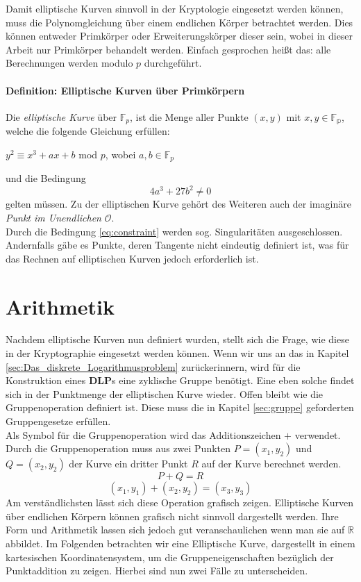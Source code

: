 Damit elliptische Kurven sinnvoll in der Kryptologie eingesetzt werden können, muss die Polynomgleichung über einem endlichen Körper betrachtet werden. Dies können entweder Primkörper oder Erweiterungskörper dieser sein, wobei in dieser Arbeit nur Primkörper behandelt werden. Einfach gesprochen heißt das: alle Berechnungen werden modulo $p$ durchgeführt.
\paragraph{Definition: Elliptische Kurven über Primkörpern}
Die \textit{elliptische Kurve} über $\mathbb{F}_p$, ist die Menge aller Punkte $(x,y)$ mit $x,y \in \mathbb{F_p}$, welche die folgende Gleichung erfüllen: 
\begin{center}
$y^2 \equiv x^3 + ax + b$ mod $p$, wobei $a,b \in \mathbb{F}_p$
\end{center} 
und die Bedingung
\begin{equation}
4a^3 + 27b^2 \neq 0
\label{eq:constraint}
\end{equation} gelten müssen. Zu der elliptischen Kurve gehört des Weiteren auch der imaginäre \textit{Punkt im Unendlichen} $\mathcal{O}$.\\

Durch die Bedingung \ref{eq:constraint} werden sog. Singularitäten ausgeschlossen. Andernfalls gäbe es Punkte, deren Tangente nicht eindeutig definiert ist, was für das Rechnen auf elliptischen Kurven jedoch erforderlich ist.\cite[273-276]{Paar.2016}

\section{Arithmetik} \label{sec:Arithmetik}
Nachdem elliptische Kurven nun definiert wurden, stellt sich die Frage, wie diese in der Kryptographie eingesetzt werden können. Wenn wir uns an das in Kapitel \ref{sec:Das_diskrete_Logarithmusproblem} zurückerinnern, wird für die Konstruktion eines \textbf{DLP}s eine zyklische Gruppe benötigt. Eine eben solche findet sich in der Punktmenge der elliptischen Kurve wieder. Offen bleibt wie die Gruppenoperation definiert ist. Diese muss die in Kapitel \ref{sec:gruppe} geforderten Gruppengesetze erfüllen.\\

Als Symbol für die Gruppenoperation wird das Additionszeichen $+$ verwendet. Durch die Gruppenoperation muss aus zwei Punkten $P = (x_1, y_2)$ und $Q= (x_2, y_2)$ der Kurve ein dritter Punkt $R$ auf der Kurve berechnet werden. 
$$P + Q = R$$ $$(x_1, y_1) +  (x_2, y_2) = (x_3, y_3)$$
Am verständlichsten lässt sich diese Operation grafisch zeigen. Elliptische Kurven über endlichen Körpern können grafisch nicht sinnvoll dargestellt werden. Ihre Form und Arithmetik lassen sich jedoch gut veranschaulichen wenn man sie auf $\mathbb{R}$ abbildet. Im Folgenden betrachten wir eine Elliptische Kurve, dargestellt in einem kartesischen Koordinatensystem, um die Gruppeneigenschaften bezüglich der Punktaddition zu zeigen. Hierbei sind nun zwei Fälle zu unterscheiden.\\

